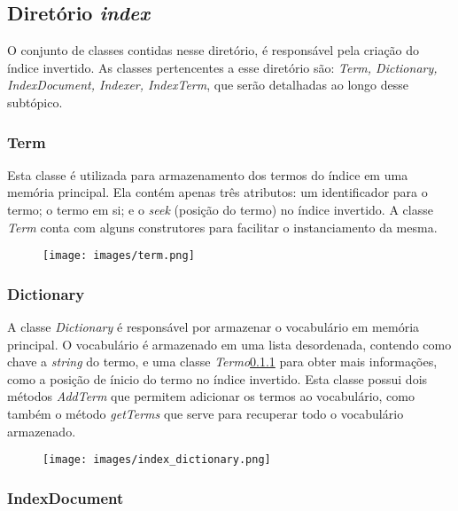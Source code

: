 \documentclass[12pt]{article}
\begin{document}
\subsection{Diretório \textit{index}}

O conjunto de classes contidas nesse diretório, é responsável pela criação do índice invertido. As classes pertencentes a esse diretório são: \textit{Term, Dictionary, IndexDocument, Indexer, IndexTerm}, que serão detalhadas ao longo desse subtópico.

\subsubsection{Term} \label{sssec:term}

Esta classe é utilizada para armazenamento dos termos do índice em uma memória principal. Ela contém apenas três atributos: um identificador para o termo; o termo em si; e o \textit{seek} (posição do termo) no índice invertido. A classe \textit{Term} conta com alguns construtores para facilitar o instanciamento da mesma.

\begin{figure}[ht]
\centering
\texttt{[image: images/term.png]}
\label{fig:term}
\end{figure}

\subsubsection{Dictionary} \label{sssec:dictionary}

A classe \textit{Dictionary} é responsável por armazenar o vocabulário em memória principal. O vocabulário é armazenado em uma lista desordenada, contendo como chave a \textit{string} do termo, e uma classe \textit{Termo}\ref{sssec:term} para obter mais informações, como a posição de ínicio do termo no índice invertido. Esta classe possui dois métodos \textit{AddTerm} que permitem adicionar os termos ao vocabulário, como também o método \textit{getTerms} que serve para recuperar todo o vocabulário armazenado.

\begin{figure}[ht]
\centering
\texttt{[image: images/index\_dictionary.png]}
\label{fig:dictionary}
\end{figure}

\subsubsection{IndexDocument} \label{sssec:indexdocument}
\end{document}
